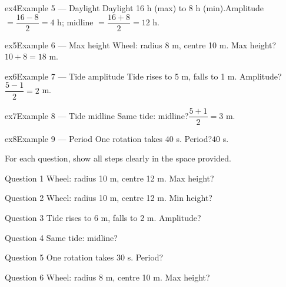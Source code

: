 \documentclass[11pt]{article}
\begin{document}
\begin{example}{ex4}{Example 5 --- Daylight}
Daylight 16 h (max) to 8 h (min).\soln Amplitude $=\dfrac{16-8}{2}=4$ h; midline $=\dfrac{16+8}{2}=12$ h.
\end{example}

\begin{example}{ex5}{Example 6 --- Max height}
Wheel: radius 8 m, centre 10 m. Max height?\soln $10+8=18$ m.
\end{example}

\begin{example}{ex6}{Example 7 --- Tide amplitude}
Tide rises to 5 m, falls to 1 m. Amplitude?\soln $\dfrac{5-1}{2}=2$ m.
\end{example}

\begin{example}{ex7}{Example 8 --- Tide midline}
Same tide: midline?\soln $\dfrac{5+1}{2}=3$ m.
\end{example}

\begin{example}{ex8}{Example 9 --- Period}
One rotation takes 40 s. Period?\soln $40$ s.
\end{example}

\clearpage
{}
For each question, show all steps clearly in the space provided.

\begin{qbox}{Question 1}
Wheel: radius 10 m, centre 12 m. Max height?\workspace{2.4cm}
\end{qbox}

\begin{qbox}{Question 2}
Wheel: radius 10 m, centre 12 m. Min height?\workspace{2.4cm}
\end{qbox}

\begin{qbox}{Question 3}
Tide rises to 6 m, falls to 2 m. Amplitude?\workspace{2.4cm}
\end{qbox}

\begin{qbox}{Question 4}
Same tide: midline?\workspace{2.4cm}
\end{qbox}

\begin{qbox}{Question 5}
One rotation takes 30 s. Period?\workspace{2.4cm}
\end{qbox}

\begin{qbox}{Question 6}
Wheel: radius 8 m, centre 10 m. Max height?\workspace{2.4cm}
\end{qbox}
\end{document}
